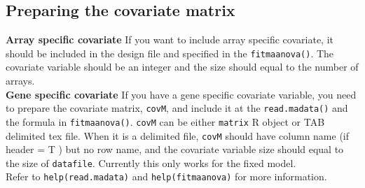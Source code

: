 \subsection{Preparing the covariate matrix}
{\bf Array specific covariate} If you want to include array specific
covariate, it should be included in the design file and specified in the {\tt fitmaanova()}. The covariate variable
should be an integer and the size should equal to the number of arrays. \\
{\bf Gene specific covariate} If you have a gene specific covariate variable,
you need to prepare the
covariate matrix, {\tt covM}, and include it at the {\tt read.madata()} and the
formula in {\tt fitmaanova()}. {\tt covM} can be either {\tt matrix} R object or
TAB delimited tex file. When it is a delimited file, {\tt covM} should have
column name (if header = T ) but no row name, and the covariate variable size should equal to
the size of {\tt datafile}. Currently this only works for the fixed model. \\
Refer to {\tt help(read.madata)} and {\tt help(fitmaanova)} for more
information. 
